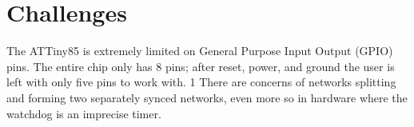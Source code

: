\section{Challenges}
\label{section:challenges}

The ATTiny85 is extremely limited on General Purpose Input Output (GPIO) pins. The entire chip only has 8 pins; after reset, power, and ground the user is left with only five pins to work with. 1
There are concerns of networks splitting and forming two separately synced networks, even more so in hardware where the watchdog is an imprecise timer. 

